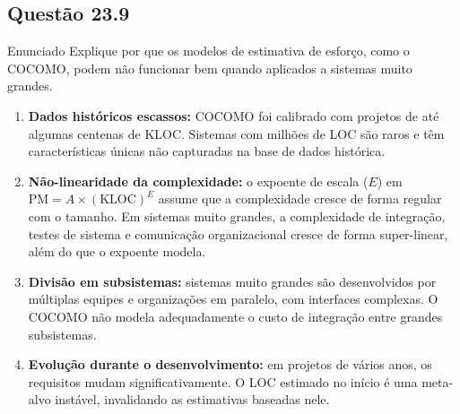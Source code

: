 \documentclass[12pt,a4paper]{article}
\begin{document}
\subsection*{Questão 23.9}
\begin{questao}{Enunciado}
Explique por que os modelos de estimativa de esforço, como o COCOMO, podem
não funcionar bem quando aplicados a sistemas muito grandes.
\end{questao}
\begin{resposta}
\begin{enumerate}[nosep]
  \item \textbf{Dados históricos escassos:} COCOMO foi calibrado com projetos
        de até algumas centenas de KLOC. Sistemas com milhões de LOC são raros
        e têm características únicas não capturadas na base de dados histórica.
  \item \textbf{Não-linearidade da complexidade:} o expoente de escala ($E$)
        em $\text{PM} = A \times (\text{KLOC})^E$ assume que a complexidade
        cresce de forma regular com o tamanho. Em sistemas muito grandes, a
        complexidade de integração, testes de sistema e comunicação organizacional
        cresce de forma super-linear, além do que o expoente modela.
  \item \textbf{Divisão em subsistemas:} sistemas muito grandes são
        desenvolvidos por múltiplas equipes e organizações em paralelo,
        com interfaces complexas. O COCOMO não modela adequadamente o custo
        de integração entre grandes subsistemas.
  \item \textbf{Evolução durante o desenvolvimento:} em projetos de vários
        anos, os requisitos mudam significativamente. O LOC estimado no
        início é uma meta-alvo instável, invalidando as estimativas baseadas
        nele.
\end{enumerate}
\end{resposta}

\end{document}
